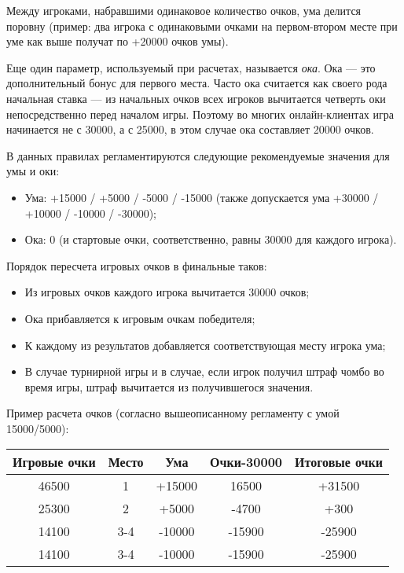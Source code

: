 Между игроками, набравшими одинаковое количество очков, ума делится поровну (пример: два игрока с одинаковыми очками на первом-втором месте при уме как выше получат по +20000 очков умы).

Еще один параметр, используемый при расчетах, называется \textit{ока}. Ока --- это дополнительный бонус для первого места. Часто ока считается как своего рода начальная ставка --- из начальных очков всех игроков вычитается четверть оки непосредственно перед началом игры. Поэтому во многих онлайн-клиентах игра начинается не с 30000, а с 25000, в этом случае ока составляет 20000 очков.

В данных правилах регламентируются следующие рекомендуемые значения для умы и оки:
\begin{itemize}
	\item Ума: +15000 / +5000 / -5000 / -15000 (также допускается ума +30000 / +10000 / -10000 / -30000);
	\item Ока: 0 (и стартовые очки, соответственно, равны 30000 для каждого игрока).
\end{itemize}

Порядок пересчета игровых очков в финальные таков:
\begin{itemize}
	\item Из игровых очков каждого игрока вычитается 30000 очков;
	\item Ока прибавляется к игровым очкам победителя;
	\item К каждому из результатов добавляется соответствующая месту игрока ума;
	\item В случае турнирной игры и в случае, если игрок получил штраф чомбо во время игры, штраф вычитается из получившегося значения.
\end{itemize}

Пример расчета очков (согласно вышеописанному регламенту с умой 15000/5000):

\noindent\begin{tabular}{ccccc}
	\toprule
	Игровые очки & Место & Ума & Очки-30000 & Итоговые очки \\	
	\midrule
	46500 & 1 & +15000 & 16500 & +31500 \\
	\midrule
	25300 & 2 & +5000 & -4700 & +300 \\
	\midrule
	14100 & 3-4 & -10000 & -15900 & -25900 \\
	\midrule
	14100 & 3-4 & -10000 & -15900 & -25900 \\
	\bottomrule
\end{tabular}

